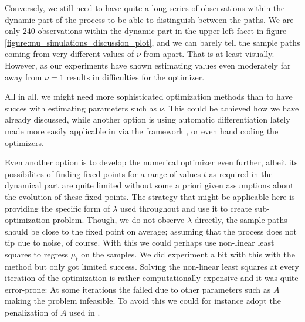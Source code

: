 Conversely, we still need to have quite a long series of observations within the dynamic part of the process to be able to distinguish between the paths. We are only 240 observations within the dynamic part in the upper left facet in figure \ref{figure:mu_simulations_discussion_plot}, and we can barely tell the sample paths coming from very different values of $\nu$ from apart. That is at least visually. However, as our experiments have shown estimating values even moderately far away from $\nu = 1$ results in difficulties for the optimizer. 

All in all, we might need more sophisticated optimization methods than  to have succes with estimating parameters such as $\nu$. This could be achieved how we have already discussed, while another option is using automatic differentiation lately made more easily applicable in  via the  framework \cite{torch}, or even hand coding the optimizers.

Even another option is to develop the numerical optimizer even further, albeit its possibilites of finding fixed points for a range of values $t$ as required in the dynamical part are quite limited without some a priori given assumptions about the evolution of these fixed points. The strategy that might be applicable here is providing the specific form of $\lambda$ used throughout and use it to create sub-optimization problem. Though, we do not observe $\lambda$ directly, the sample paths should be close to the fixed point on average; assuming that the process does not tip due to noise, of course. With this we could perhaps use non-linear least squares to regress $\mu_t$ on the samples. We did experiment a bit with this with the method  but only got limited success. Solving the non-linear least squares at every iteration of the optimization is rather computationally expensive and it was quite error-prone: At some iterations the  failed due to other parameters such as $A$ making the problem infeasible. To avoid this we could for instance adopt the penalization of $A$ used in \cite{Ditlevsen2023}.

